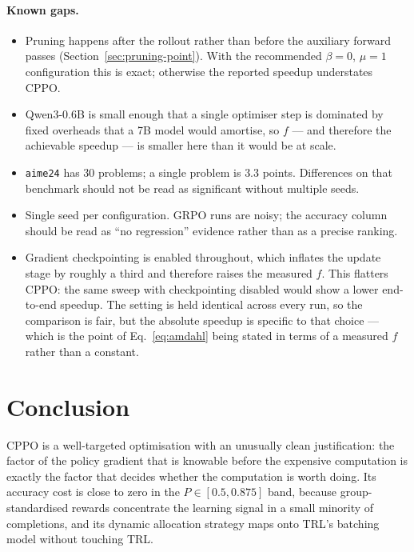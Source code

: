 \documentclass[11pt,a4paper]{article}
\begin{document}
\paragraph{Known gaps.}
\begin{itemize}
  \item Pruning happens after the rollout rather than before the auxiliary
  forward passes (Section~\ref{sec:pruning-point}). With the recommended
  $\beta = 0$, $\mu = 1$ configuration this is exact; otherwise the reported
  speedup understates CPPO.
  \item Qwen3-0.6B is small enough that a single optimiser step is dominated
  by fixed overheads that a 7B model would amortise, so $f$ --- and therefore
  the achievable speedup --- is smaller here than it would be at scale.
  \item \texttt{aime24} has 30 problems; a single problem is $3.3$ points.
  Differences on that benchmark should not be read as significant without
  multiple seeds.
  \item Single seed per configuration. GRPO runs are noisy; the accuracy
  column should be read as ``no regression'' evidence rather than as a precise
  ranking.
  \item Gradient checkpointing is enabled throughout, which inflates the
  update stage by roughly a third and therefore raises the measured $f$. This
  flatters CPPO: the same sweep with checkpointing disabled would show a lower
  end-to-end speedup. The setting is held identical across every run, so the
  comparison is fair, but the absolute speedup is specific to that choice ---
  which is the point of Eq.~\eqref{eq:amdahl} being stated in terms of a
  measured $f$ rather than a constant.
\end{itemize}

\section{Conclusion}
\label{sec:conclusion}

CPPO is a well-targeted optimisation with an unusually clean justification:
the factor of the policy gradient that is knowable before the expensive
computation is exactly the factor that decides whether the computation is
worth doing. Its accuracy cost is close to zero in the $P \in [0.5, 0.875]$
band, because group-standardised rewards concentrate the learning signal in a
small minority of completions, and its dynamic allocation strategy maps onto
TRL's batching model without touching TRL.
\end{document}
